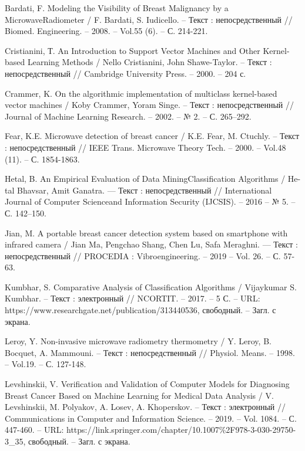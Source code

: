 \newpage
{}
\begin{thebibliography}{3}
	 Bardati, F. Modeling the Visibility of Breast Malignancy by a MicrowaveRadiometer / F. Bardati, S. Iudicello. -- Текст : непосредственный // Biomed. Engineering. -- 2008. -- Vol.55 (6). -- С. 214-221.
	
	 Cristianini, Т. An Introduction to Support Vector Machines and Other Kernel-based Learning Methods / Nello Cristianini, John Shawe-Taylor. -- Текст : непосредственный // Cambridge University Press. -- 2000. -- 204 с.
	
	 Crammer, K. On the algorithmic implementation of multiclass kernel-based vector machines / Koby Crammer, Yoram Singe. -- Текст : непосредственный // Journal of Machine Learning Research. -- 2002. -- № 2. -- С. 265–292.
	
	 Fear, K.E. Microwave detection of breast cancer / K.E. Fear, M. Ctuchly. -- Текст : непосредственный // IEEE Trans. Microwave Theory Tech. -- 2000. -- Vol.48 (11). -- С. 1854-1863.
	
	 Hetal, B. An Empirical Evaluation of Data MiningClassification Algorithms / He-tal Bhavsar, Amit Ganatra. — Текст : непосредственный // International Journal of Computer Scienceand Information Security (IJCSIS). -- 2016 -- № 5. -- С. 142–150. 
	
	 Jian, M. A portable breast cancer detection system based on smartphone with infrared camera / Jian Ma, Pengchao Shang, Chen Lu, Safa Meraghni. — Текст : непосредственный // PROCEDIA : Vibroengineering. -- 2019 -- Vol. 26. -- С. 57-63. 
	
	 Kumbhar, S. Comparative Analysis of Classification Algorithms / Vijaykumar S. Kumbhar. -- Текст : электронный // NCORTIT. -- 2017. -- 5 С. -- URL: https://www.researchgate.net/publication/313440536, свободный. -- Загл. с экрана.
	
	 Leroy, Y. Non-invasive microwave radiometry thermometry / Y. Leroy, B. Bocquet, A. Mammouni. -- Текст : непосредственный // Physiol. Means. -- 1998. -- Vol.19. -- С. 127-148.
	
	 Levshinskii, V. Verification and Validation of Computer Models for Diagnosing Breast Cancer Based on Machine Learning for Medical Data Analysis / V. Levshinskii, M. Polyakov, A. Losev, A. Khoperskov. -- Текст : электронный // Communications in Computer and Information Science. -- 2019. -- Vol. 1084. -- С. 447-460. -- URL: https://link.springer.com/chapter/10.1007\%2F978-3-030-29750-3\_35, свободный. -- Загл. с экрана.
	

\end{thebibliography}
